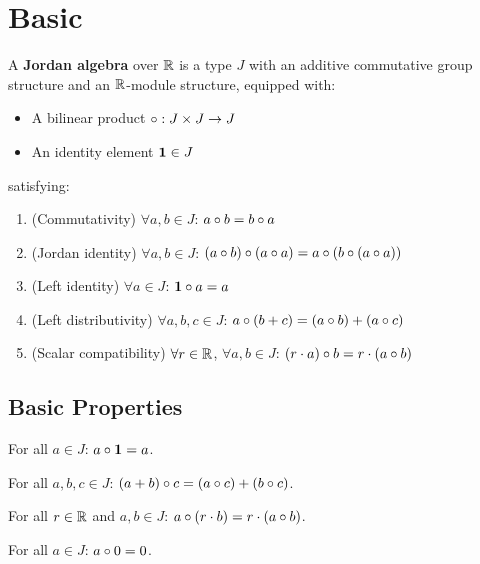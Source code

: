 \section{Basic}

\begin{definition}[JordanAlgebra]
A \textbf{Jordan algebra} over $\mathbb{R}$ is a type $J$ with an additive commutative group structure and an $\mathbb{R}$-module structure, equipped with:
\begin{itemize}
  \item A bilinear product $\circ : J \times J \to J$
  \item An identity element $\mathbf{1} \in J$
\end{itemize}
satisfying:
\begin{enumerate}
  \item (Commutativity) $\forall a, b \in J$: $a \circ b = b \circ a$
  \item (Jordan identity) $\forall a, b \in J$: $(a \circ b) \circ (a \circ a) = a \circ (b \circ (a \circ a))$
  \item (Left identity) $\forall a \in J$: $\mathbf{1} \circ a = a$
  \item (Left distributivity) $\forall a, b, c \in J$: $a \circ (b + c) = (a \circ b) + (a \circ c)$
  \item (Scalar compatibility) $\forall r \in \mathbb{R}$, $\forall a, b \in J$: $(r \cdot a) \circ b = r \cdot (a \circ b)$
\end{enumerate}
\end{definition}

\subsection{Basic Properties}

\begin{lemma}
For all $a \in J$: $a \circ \mathbf{1} = a$.
\end{lemma}

\begin{lemma}
For all $a, b, c \in J$: $(a + b) \circ c = (a \circ c) + (b \circ c)$.
\end{lemma}

\begin{lemma}
For all $r \in \mathbb{R}$ and $a, b \in J$: $a \circ (r \cdot b) = r \cdot (a \circ b)$.
\end{lemma}

\begin{lemma}
For all $a \in J$: $a \circ 0 = 0$.
\end{lemma}

